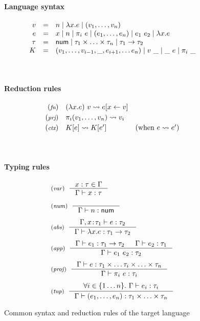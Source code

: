 \begin{figure}[t]
\paragraph{Language syntax}
\begin{equation*}
\begin{array}{rcl}
  v &  = & n \; | \; \lambda x.e \; | \; (v_1, \ldots, v_n) \\
  e &  = & x \; | \; n \; | \; \pi_i~e \; | \; (e_1, \ldots, e_n) \; | \; e_1~e_2 \; | \; \lambda x.e \\
  \tau &  = & \textnormal{\sffamily num} \; | \; \tau_1 \times \ldots \times \tau_n \; | \; \tau_1 \rightarrow \tau_2 \\
  K  & = & (v_1, \ldots, v_{i-1}, \_, e_{i+1}, \ldots e_n) \; | \; v~\_ \; | \; \_~e \; | \; \pi_i~\_
\end{array}
\end{equation*}

~
\paragraph{Reduction rules}
\begin{equation*}
\begin{array}{rll}
  \footnotesize{(\emph{fn})}  & (\lambda x.e)~v \rightsquigarrow e[x\leftarrow v] \\[0.25em]
  \footnotesize{(\emph{prj})} & \pi_i (v_1, \ldots, v_n) \rightsquigarrow v_i\\[0.25em]
  \footnotesize{(\emph{ctx})}  & K[e] \rightsquigarrow K[e']  & (\textnormal{when}~e\rightsquigarrow e')\\[0.25em]
\end{array}
\end{equation*}

~
\paragraph{Typing rules}
\begin{equation*}
\begin{array}{l}
\tyrule{var}
  { x:\tau \in \Gamma }
  { \Gamma \vdash x:\tau }
\\[1.25em]
\tyrule{num}
  { ~ }
  { \Gamma \vdash n:\ident{num} }
\\[1.25em]
\tyrule{abs}
  { \Gamma, x\!:\!\tau_1 \vdash e : \tau_2 }
  { \Gamma \vdash \lambda x.e : \tau_1 \rightarrow \tau_2 }
\\[1.25em]
\tyrule{app}
  { \Gamma \vdash e_1 : \tau_1 \rightarrow \tau_2  & \Gamma \vdash e_2 : \tau_1 }
  { \Gamma \vdash e_1~e_2 : \tau_2 }
\\[1.25em]
\tyrule{proj}
  { \Gamma \vdash e : \tau_1 \times \ldots \tau_i \times \ldots \times \tau_n }
  { \Gamma \vdash \pi_i~e:\tau_i }
\\[1.25em]
\tyrule{tup}
  { \forall i\in\{1 \ldots n\}.~ \Gamma \vdash e_i : \tau_i }
  { \Gamma \vdash (e_1, \ldots, e_n) : \tau_1 \times \ldots \times \tau_n }
\end{array}
\end{equation*}

\caption{Common syntax and reduction rules of the target language}
\label{fig:semantics-target}
\end{figure}

